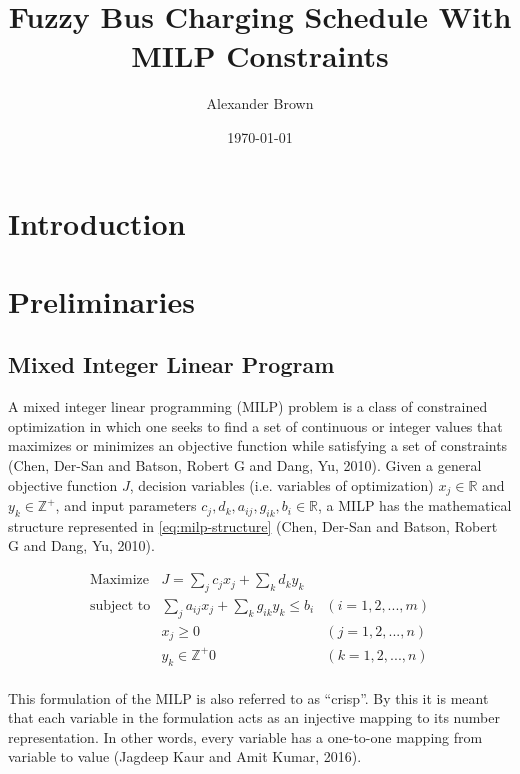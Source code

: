 \documentclass[11pt,a4paper,final]{article}
\author{Alexander Brown}
\date{\today}
\title{Fuzzy Bus Charging Schedule With MILP Constraints}
\begin{document}
\maketitle
\tableofcontents

\let\ref\autoref                            %

\section{Introduction}
\label{sec:org6f00db4}
\section{Preliminaries}
\label{sec:org1480dc2}
\subsection{Mixed Integer Linear Program}
\label{sec:orgc90e105}
A mixed integer linear programming (MILP) problem is a class of constrained optimization in which one seeks to find a
set of continuous or integer values that maximizes or minimizes an objective function while satisfying a set of
constraints (Chen, Der-San and Batson, Robert G and Dang, Yu, 2010). Given a general objective function \(J\), decision variables (i.e. variables of
optimization) \(x_j \in \mathbb{R}\) and \(y_k \in \mathbb{Z}^+\), and input parameters \(c_j, d_k, a_{ij}, g_{ik}, b_i \in \mathbb{R}\), a MILP has the
mathematical structure represented in \ref{eq:milp-structure} (Chen, Der-San and Batson, Robert G and Dang, Yu, 2010).

\begin{equation}
\label{eq:milp-structure}
\begin{array}{lll}
\text{Maximize}   & J = \sum_j c_j x_j + \sum_k d_k y_k            &                 \\
\text{subject to} & \sum_j a_{ij} x_j + \sum_k g_{ik} y_k  \le b_i & (i = 1,2,...,m) \\
                  & x_j \ge 0                                      & (j = 1,2,...,n) \\
                  & y_k \in \mathbb{Z^+}0                          & (k = 1,2,...,n) \\
\end{array}
\end{equation}

This formulation of the MILP is also referred to as ``crisp''. By this it is meant that each variable in the formulation
acts as an injective mapping to its number representation. In other words, every variable has a one-to-one mapping from
variable to value (Jagdeep Kaur and Amit Kumar, 2016).
\end{document}
